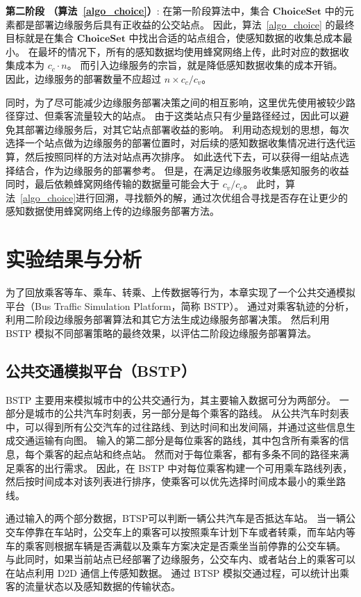 \textbf{第二阶段 （算法~\ref{algo_choice}）}:
在第一阶段算法中，集合 $\boldsymbol{ChoiceSet}$ 中的元素都是部署边缘服务后具有正收益的公交站点。
因此，算法~\ref{algo_choice} 的最终目标就是在集合 $\boldsymbol{ChoiceSet}$ 中找出合适的站点组合，使感知数据的收集总成本最小。
在最坏的情况下，所有的感知数据均使用蜂窝网络上传，此时对应的数据收集成本为 $c_c \cdot n$。
而引入边缘服务的宗旨，就是降低感知数据收集的成本开销。
因此，边缘服务的部署数量不应超过 $n\times c_c / c_v$。

同时，为了尽可能减少边缘服务部署决策之间的相互影响，这里优先使用被较少路径穿过、但乘客流量较大的站点。
由于这类站点只有少量路径经过，因此可以避免其部署边缘服务后，对其它站点部署收益的影响。
利用动态规划的思想，每次选择一个站点做为边缘服务的部署位置时，对后续的感知数据收集情况进行迭代运算，然后按照同样的方法对站点再次排序。
如此迭代下去，可以获得一组站点选择结合，作为边缘服务的部署参考。
但是，在满足边缘服务收集感知服务的收益同时，最后依赖蜂窝网络传输的数据量可能会大于 $c_v / c_c$。
此时，算法~\ref{algo_choice}进行回溯，寻找额外的解，通过次优组合寻找是否存在让更少的感知数据使用蜂窝网络上传的边缘服务部署方法。

\section{实验结果与分析}

为了回放乘客等车、乘车、转乘、上传数据等行为，本章实现了一个公共交通模拟平台（Bus Traffic Simulation Platform，简称 BSTP）。
通过对乘客轨迹的分析，利用二阶段边缘服务部署算法和其它方法生成边缘服务部署决策。
然后利用 BSTP 模拟不同部署策略的最终效果，以评估二阶段边缘服务部署算法。

\subsection{公共交通模拟平台（BSTP）}

BSTP 主要用来模拟城市中的公共交通行为，其主要输入数据可分为两部分。
一部分是城市的公共汽车时刻表，另一部分是每个乘客的路线。
从公共汽车时刻表中，可以得到所有公交汽车的过往路线、到达时间和出发间隔，并通过这些信息生成交通运输有向图。
输入的第二部分是每位乘客的路线，其中包含所有乘客的信息，每个乘客的起点站和终点站。
然而对于每位乘客，都有多条不同的路径来满足乘客的出行需求。
因此，在 BSTP 中对每位乘客构建一个可用乘车路线列表，然后按时间成本对该列表进行排序，使乘客可以优先选择时间成本最小的乘坐路线。

通过输入的两个部分数据，BTSP可以判断一辆公共汽车是否抵达车站。
当一辆公交车停靠在车站时，公交车上的乘客可以按照乘车计划下车或者转乘，而车站内等车的乘客则根据车辆是否满载以及乘车方案决定是否乘坐当前停靠的公交车辆。
与此同时，如果当前站点已经部署了边缘服务，公交车内、或者站台上的乘客可以在站点利用 D2D 通信上传感知数据。
通过 BTSP 模拟交通过程，可以统计出乘客的流量状态以及感知数据的传输状态。

